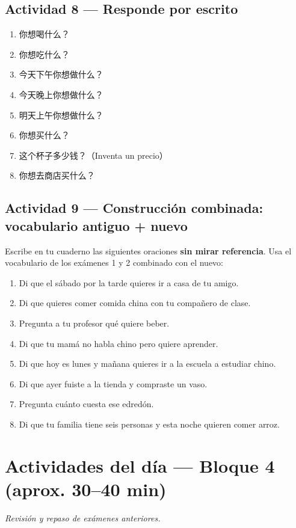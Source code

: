\documentclass[12pt, a4paper]{article}
\begin{document}
\subsection{Actividad 8 — Responde por escrito}

\begin{enumerate}[leftmargin=1.5cm]
\item 你想喝什么？
\item 你想吃什么？
\item 今天下午你想做什么？
\item 今天晚上你想做什么？
\item 明天上午你想做什么？
\item 你想买什么？
\item 这个杯子多少钱？（Inventa un precio）
\item 你想去商店买什么？
\end{enumerate}

\subsection{Actividad 9 — Construcción combinada: vocabulario antiguo + nuevo}

Escribe en tu cuaderno las siguientes oraciones \textbf{sin mirar referencia}. Usa el vocabulario de los exámenes 1 y 2 combinado con el nuevo:

\begin{enumerate}[leftmargin=1.5cm]
\item Di que el sábado por la tarde quieres ir a casa de tu amigo.
\item Di que quieres comer comida china con tu compañero de clase.
\item Pregunta a tu profesor qué quiere beber.
\item Di que tu mamá no habla chino pero quiere aprender.
\item Di que hoy es lunes y mañana quieres ir a la escuela a estudiar chino.
\item Di que ayer fuiste a la tienda y compraste un vaso.
\item Pregunta cuánto cuesta ese edredón.
\item Di que tu familia tiene seis personas y esta noche quieren comer arroz.
\end{enumerate}

\section{Actividades del día — Bloque 4 (aprox. 30--40 min)}
\textit{Revisión y repaso de exámenes anteriores.}
\end{document}
